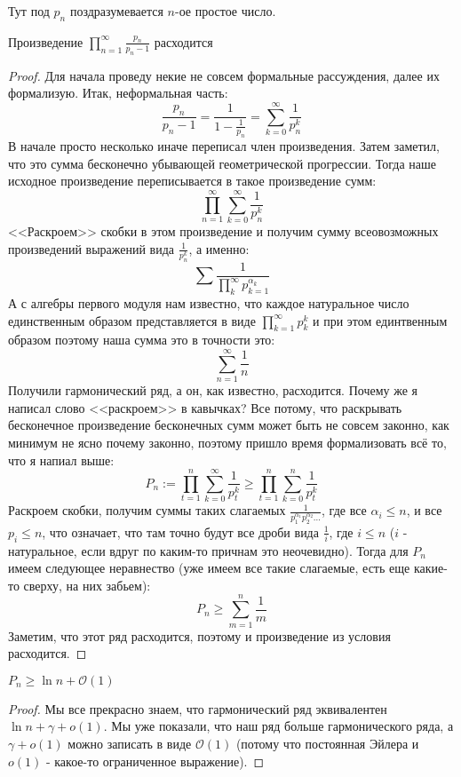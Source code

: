 Тут под $p_n$ поздразумевается $n$-ое простое число.

\begin{statement} \thmslashn

  Произведение $\prod_{n=1}^\infty \frac{p_n}{p_n-1}$ расходится
  \begin{proof} \thmslashn
    
    Для начала проведу некие не совсем формальные рассуждения, далее их формализую. Итак, неформальная часть:
    $$\frac{p_n}{p_n - 1} = \frac{1}{1 - \frac{1}{p_n}} = \sum_{k=0}^\infty\frac{1}{p_n^k}$$
    В начале просто несколько иначе переписал член произведения. Затем заметил, что это сумма бесконечно убывающей геометрической прогрессии. Тогда наше исходное произведение переписывается в такое произведение сумм:
    $$\prod_{n=1}^\infty\sum_{k=0}^\infty\frac{1}{p_n^k}$$
    <<Раскроем>> скобки в этом произведение и получим сумму всеовозможных произведений выражений вида $\frac{1}{p_n^k}$, а именно:
    $$\sum \frac{1}{\prod\limits_k^\infty p_{k=1}^{\alpha_k}}$$
    А с алгебры первого модуля нам известно, что каждое натуральное число единственным образом представляется в виде $\prod_{k=1}^\infty p_k^k$ и при этом единтвенным образом поэтому наша сумма это в точности это:
    $$\sum_{n = 1}^\infty\frac{1}{n}$$
    Получили гармонический ряд, а он, как известно, расходится. Почему же я написал слово <<раскроем>> в кавычках? Все потому, что раскрывать бесконечное произведение бесконечных сумм может быть не совсем законно, как минимум не ясно почему законно, поэтому пришло время формализовать всё то, что я напиал выше:
    $$P_n := \prod_{t=1}^n\sum_{k=0}^\infty\frac{1}{p_t^k} \geqslant \prod_{t=1}^n\sum_{k=0}^n\frac{1}{p_t^k}$$
    Раскроем скобки, получим суммы таких слагаемых $\frac{1}{p_1^{\alpha_1}p_2^{\alpha_2}...}$, где все $\alpha_i \leqslant n$, и все $p_i \leqslant n$, что означает, что там точно будут все дроби вида $\frac{1}{i}$, где $i \leqslant n$ ($i$ - натуральное, если вдруг по каким-то причнам это неочевидно). Тогда для $P_n$ имеем следующее неравнество (уже имеем все такие слагаемые, есть еще какие-то сверху, на них забьем):
    $$P_n \geqslant \sum_{m=1}^n\frac{1}{m}$$
    Заметим, что этот ряд расходится, поэтому и произведение из условия расходится.
  \end{proof}
  \begin{remark} \thmslashn

    $P_n \geqslant \ln n + \mathcal{O}(1)$
    \begin{proof} \thmslashn
      
      
      Мы все прекрасно знаем, что гармонический ряд эквивалентен $\ln n + \gamma + o(1)$. Мы уже показали, что наш ряд больше гармонического ряда, а $\gamma + o(1)$ можно записать в виде $\mathcal{O}(1)$ (потому что постоянная Эйлера и $o(1)$ - какое-то ограниченное выражение). 
    \end{proof}
  \end{remark}
\end{statement}
